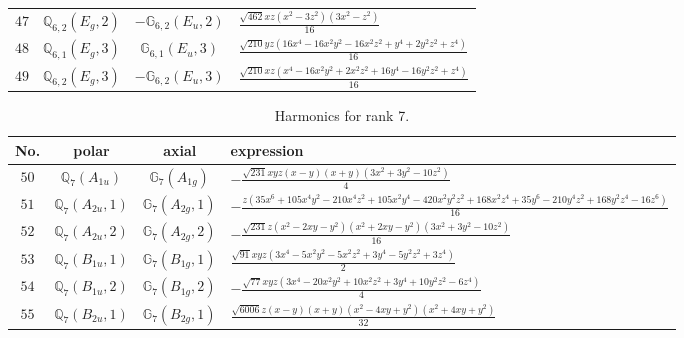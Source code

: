 \documentclass[fleqn,8pt,landscape]{jsarticle}
\begin{document}
\begin{table}[ht!]
\begin{center}
\begin{tabular}{cccl}
$ 47 $ & $ \mathbb{Q}_{6,2}(E_{g},2) $ & $ -\mathbb{G}_{6,2}(E_{u},2) $ & $ \frac{\sqrt{462} x z \left(x^{2} - 3 z^{2}\right) \left(3 x^{2} - z^{2}\right)}{16} $ \\
$ 48 $ & $ \mathbb{Q}_{6,1}(E_{g},3) $ & $ \mathbb{G}_{6,1}(E_{u},3) $ & $ \frac{\sqrt{210} y z \left(16 x^{4} - 16 x^{2} y^{2} - 16 x^{2} z^{2} + y^{4} + 2 y^{2} z^{2} + z^{4}\right)}{16} $ \\
$ 49 $ & $ \mathbb{Q}_{6,2}(E_{g},3) $ & $ -\mathbb{G}_{6,2}(E_{u},3) $ & $ \frac{\sqrt{210} x z \left(x^{4} - 16 x^{2} y^{2} + 2 x^{2} z^{2} + 16 y^{4} - 16 y^{2} z^{2} + z^{4}\right)}{16} $ \\
 \hline \hline
\end{tabular}
\end{center}
\end{table}
\begin{table}[ht!]
\begin{center}
\caption{Harmonics for rank 7.}
\renewcommand{\arraystretch}{1.3}
\begin{tabular}{cccl} \hline \hline
No. & polar & axial & expression \\ \hline
$ 50 $ & $ \mathbb{Q}_{7}(A_{1u}) $ & $ \mathbb{G}_{7}(A_{1g}) $ & $ - \frac{\sqrt{231} x y z \left(x - y\right) \left(x + y\right) \left(3 x^{2} + 3 y^{2} - 10 z^{2}\right)}{4} $ \\
$ 51 $ & $ \mathbb{Q}_{7}(A_{2u},1) $ & $ \mathbb{G}_{7}(A_{2g},1) $ & $ - \frac{z \left(35 x^{6} + 105 x^{4} y^{2} - 210 x^{4} z^{2} + 105 x^{2} y^{4} - 420 x^{2} y^{2} z^{2} + 168 x^{2} z^{4} + 35 y^{6} - 210 y^{4} z^{2} + 168 y^{2} z^{4} - 16 z^{6}\right)}{16} $ \\
$ 52 $ & $ \mathbb{Q}_{7}(A_{2u},2) $ & $ \mathbb{G}_{7}(A_{2g},2) $ & $ - \frac{\sqrt{231} z \left(x^{2} - 2 x y - y^{2}\right) \left(x^{2} + 2 x y - y^{2}\right) \left(3 x^{2} + 3 y^{2} - 10 z^{2}\right)}{16} $ \\
$ 53 $ & $ \mathbb{Q}_{7}(B_{1u},1) $ & $ \mathbb{G}_{7}(B_{1g},1) $ & $ \frac{\sqrt{91} x y z \left(3 x^{4} - 5 x^{2} y^{2} - 5 x^{2} z^{2} + 3 y^{4} - 5 y^{2} z^{2} + 3 z^{4}\right)}{2} $ \\
$ 54 $ & $ \mathbb{Q}_{7}(B_{1u},2) $ & $ \mathbb{G}_{7}(B_{1g},2) $ & $ - \frac{\sqrt{77} x y z \left(3 x^{4} - 20 x^{2} y^{2} + 10 x^{2} z^{2} + 3 y^{4} + 10 y^{2} z^{2} - 6 z^{4}\right)}{4} $ \\
$ 55 $ & $ \mathbb{Q}_{7}(B_{2u},1) $ & $ \mathbb{G}_{7}(B_{2g},1) $ & $ \frac{\sqrt{6006} z \left(x - y\right) \left(x + y\right) \left(x^{2} - 4 x y + y^{2}\right) \left(x^{2} + 4 x y + y^{2}\right)}{32} $ \\

\end{tabular}
\end{center}
\end{table}
\end{document}
